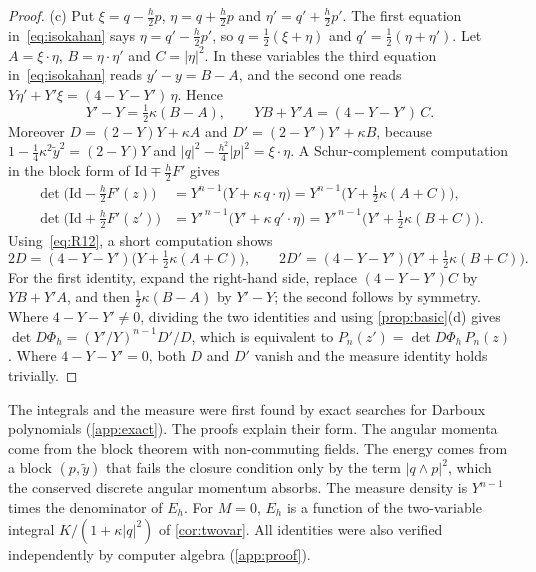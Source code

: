 \documentclass[11pt,a4paper]{article}
\theoremstyle{definition}
\theoremstyle{remark}
\newcommand{\Id}{\mathrm{Id}}
\begin{document}
\begin{proof}
(c) Put $\xi=q-\frac h2p$, $\eta=q+\frac h2p$ and $\eta'=q'+\frac h2p'$. The first equation in~\eqref{eq:isokahan}
says $\eta=q'-\frac h2p'$, so $q=\frac12(\xi+\eta)$ and $q'=\frac12(\eta+\eta')$. Let $A=\xi\cdot\eta$,
$B=\eta\cdot\eta'$ and $C=\lvert\eta\rvert^2$. In these variables the third equation in~\eqref{eq:isokahan} reads $y'-y=B-A$, and the
second one reads $Y\eta'+Y'\xi=(4-Y-Y')\,\eta$. Hence
\begin{equation}\label{eq:R12}
Y'-Y=\tfrac12\kappa(B-A),\qquad YB+Y'A=(4-Y-Y')\,C .
\end{equation}
Moreover $D=(2-Y)Y+\kappa A$ and $D'=(2-Y')Y'+\kappa B$, because $1-\frac14\kappa^2\tilde y^2=(2-Y)Y$ and
$\lvert q\rvert^2-\frac{h^2}4\lvert p\rvert^2=\xi\cdot\eta$. A Schur-complement computation in the block form of
$\Id\mp\frac h2F'$ gives
\begin{align*}
\det\big(\Id-\tfrac h2F'(z)\big)&=Y^{n-1}\big(Y+\kappa\,q\cdot\eta\big)=Y^{n-1}\big(Y+\tfrac12\kappa(A+C)\big),\\
\det\big(\Id+\tfrac h2F'(z')\big)&=Y'^{\,n-1}\big(Y'+\kappa\,q'\cdot\eta\big)=Y'^{\,n-1}\big(Y'+\tfrac12\kappa(B+C)\big).
\end{align*}
Using~\eqref{eq:R12}, a short computation shows
\[
2D=(4-Y-Y')\big(Y+\tfrac12\kappa(A+C)\big),\qquad 2D'=(4-Y-Y')\big(Y'+\tfrac12\kappa(B+C)\big).
\]
For the first identity, expand the right-hand side, replace $(4-Y-Y')C$ by $YB+Y'A$, and then
$\frac12\kappa(B-A)$ by $Y'-Y$; the second follows by symmetry. Where $4-Y-Y'\ne0$, dividing the two identities
and using \cref{prop:basic}(d) gives $\det D\Phi_h=(Y'/Y)^{n-1}D'/D$, which is equivalent to
$P_n(z')=\det D\Phi_h\,P_n(z)$. Where $4-Y-Y'=0$, both $D$ and $D'$ vanish and the measure identity holds
trivially.
\end{proof}

The integrals and the measure were first found by exact searches for Darboux polynomials (\cref{app:exact}).
The proofs explain their form. The angular momenta come from the block theorem with non-commuting fields. The
energy comes from a block $(p,\tilde y)$ that fails the closure condition only by the term
$\lvert q\wedge p\rvert^2$, which the conserved discrete angular momentum absorbs. The measure density is
$Y^{n-1}$ times the denominator of $E_h$. For $M=0$, $E_h$ is a function of the two-variable integral
$K/(1+\kappa\lvert q\rvert^2)$ of \cref{cor:twovar}. All identities were also verified independently by computer
algebra (\cref{app:proof}).
\end{document}
